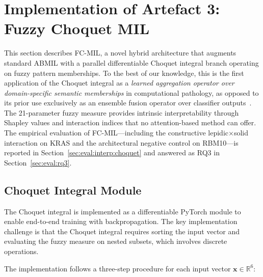 \section{Implementation of Artefact 3: Fuzzy Choquet MIL}
\label{sec:impl:choquet}

This section describes FC-MIL, a novel hybrid architecture that
augments standard ABMIL with a parallel differentiable Choquet integral
branch operating on fuzzy pattern memberships.
To the best of our knowledge, this is the first application of the
Choquet integral as a \emph{learned aggregation operator over
domain-specific semantic memberships} in computational pathology,
as opposed to its prior use exclusively as an ensemble fusion operator
over classifier outputs~\cite{bhowal2021fuzzybach,mccurley2023mici}.
The 21-parameter fuzzy measure provides intrinsic interpretability
through Shapley values and interaction indices that no attention-based
method can offer.
The empirical evaluation of FC-MIL---including the constructive
lepidic$\times$solid interaction on KRAS and the architectural
negative control on RBM10---is reported in
Section~\ref{sec:eval:interp:choquet} and answered as RQ3 in
Section~\ref{sec:eval:rq3}.

\subsection{Choquet Integral Module}
\label{sec:impl:choquet:module}

The Choquet integral is implemented as a differentiable PyTorch module to enable end-to-end training with backpropagation.
The key implementation challenge is that the Choquet integral requires sorting the input vector and evaluating the fuzzy measure on nested subsets, which involves discrete operations.

The implementation follows a three-step procedure for each input vector $\mathbf{x} \in \mathbb{R}^6$:

